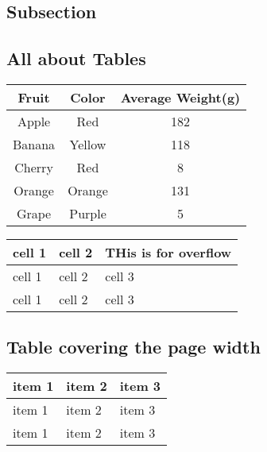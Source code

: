 \documentclass{report}
\begin{document}
\subsection{Subsection}
\lipsum[1-2]
\subsection{All about Tables}
\begin{center}
    \begin{tabular}{|c|c|c|}
    \hline
        \textbf{Fruit} & \textbf{Color} & \textbf{Average Weight(g)} \\
        \hline
        Apple & Red & 182 \\
        \hline
        Banana & Yellow & 118 \\
        \hline
        Cherry & Red & 8 \\
        \hline
        Orange & Orange & 131 \\
        \hline
        Grape & Purple & 5 \\
        \hline
    \end{tabular}
\end{center}
\begin{center}
    \begin{tabular}{|m{5em}|m{1cm}|m{1cm}|}
        \hline
        cell 1 & cell 2 & THis is for overflow \\
        \hline
        cell 1 & cell 2 & cell 3 \\
       \hline
       cell 1 & cell 2 & cell 3 \\
       \hline
    \end{tabular}
\end{center}

\subsection{Table covering the page width}
\begin{center}
    \begin{tabularx}{0.8\textwidth}{
        | >{\raggedright\arraybackslash}X
        | >{\centering\arraybackslash}X
        | >{\raggedleft\arraybackslash}X|}    
        \hline
        item 1 & item 2 & item 3 \\
        \hline
        item 1 & item 2 & item 3 \\
        \hline
        item 1 & item 2 & item 3 \\
        \hline
    \end{tabularx}   
\end{center}
\end{document}
